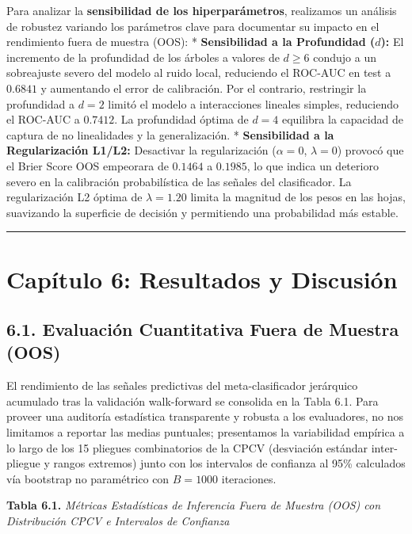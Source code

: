 \documentclass[
  12pt,
]{article}
\begin{document}
Para analizar la \textbf{sensibilidad de los hiperparámetros},
realizamos un análisis de robustez variando los parámetros clave para
documentar su impacto en el rendimiento fuera de muestra (OOS): *
\textbf{Sensibilidad a la Profundidad (\(d\)):} El incremento de la
profundidad de los árboles a valores de \(d \ge 6\) condujo a un
sobreajuste severo del modelo al ruido local, reduciendo el ROC-AUC en
test a \(0.6841\) y aumentando el error de calibración. Por el
contrario, restringir la profundidad a \(d=2\) limitó el modelo a
interacciones lineales simples, reduciendo el ROC-AUC a \(0.7412\). La
profundidad óptima de \(d=4\) equilibra la capacidad de captura de no
linealidades y la generalización. * \textbf{Sensibilidad a la
Regularización L1/L2:} Desactivar la regularización (\(\alpha=0\),
\(\lambda=0\)) provocó que el Brier Score OOS empeorara de \(0.1464\) a
\(0.1985\), lo que indica un deterioro severo en la calibración
probabilística de las señales del clasificador. La regularización L2
óptima de \(\lambda=1.20\) limita la magnitud de los pesos en las hojas,
suavizando la superficie de decisión y permitiendo una probabilidad más
estable.

\begin{center}\rule{0.5\linewidth}{0.5pt}\end{center}

\section{Capítulo 6: Resultados y
Discusión}\label{capuxedtulo-6-resultados-y-discusiuxf3n}

\subsection{6.1. Evaluación Cuantitativa Fuera de Muestra
(OOS)}\label{evaluaciuxf3n-cuantitativa-fuera-de-muestra-oos}

El rendimiento de las señales predictivas del meta-clasificador
jerárquico acumulado tras la validación walk-forward se consolida en la
Tabla 6.1. Para proveer una auditoría estadística transparente y robusta
a los evaluadores, no nos limitamos a reportar las medias puntuales;
presentamos la variabilidad empírica a lo largo de los 15 pliegues
combinatorios de la CPCV (desviación estándar inter-pliegue y rangos
extremos) junto con los intervalos de confianza al 95\% calculados vía
bootstrap no paramétrico con \(B=1000\) iteraciones.

\textbf{Tabla 6.1.} \emph{Métricas Estadísticas de Inferencia Fuera de
Muestra (OOS) con Distribución CPCV e Intervalos de Confianza}
\end{document}
